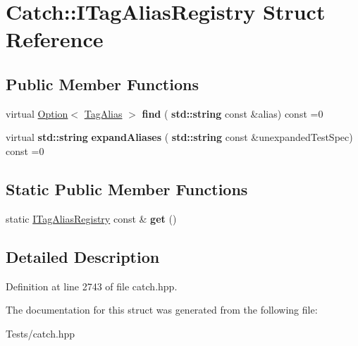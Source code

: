 \hypertarget{struct_catch_1_1_i_tag_alias_registry}{}\section{Catch\+:\+:I\+Tag\+Alias\+Registry Struct Reference}
\label{struct_catch_1_1_i_tag_alias_registry}
\subsection*{Public Member Functions}
\begin{DoxyCompactItemize}
\item 
\mbox{\label{struct_catch_1_1_i_tag_alias_registry_a7d2fba4d39cfcc62c2695fcde4f989c3}} 
virtual \hyperlink{class_catch_1_1_option}{Option}$<$ \hyperlink{struct_catch_1_1_tag_alias}{Tag\+Alias} $>$ {\bfseries find} (\textbf{ std\+::string} const \&alias) const =0
\item 
\mbox{\label{struct_catch_1_1_i_tag_alias_registry_ae729a7532faf7466db1a157ce0395170}} 
virtual \textbf{ std\+::string} {\bfseries expand\+Aliases} (\textbf{ std\+::string} const \&unexpanded\+Test\+Spec) const =0
\end{DoxyCompactItemize}
\subsection*{Static Public Member Functions}
\begin{DoxyCompactItemize}
\item 
\mbox{\label{struct_catch_1_1_i_tag_alias_registry_aa9d0f008f49473389c7abf6071f137a7}} 
static \hyperlink{struct_catch_1_1_i_tag_alias_registry}{I\+Tag\+Alias\+Registry} const  \& {\bfseries get} ()
\end{DoxyCompactItemize}


\subsection{Detailed Description}


Definition at line 2743 of file catch.\+hpp.



The documentation for this struct was generated from the following file\+:\begin{DoxyCompactItemize}
\item 
Tests/catch.\+hpp\end{DoxyCompactItemize}
